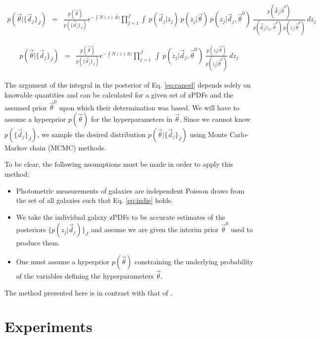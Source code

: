 \documentclass[preprint]{aastex}
\begin{document}
\begin{eqnarray}
\label{eq:expand}
p(\vec{\theta}|\{\vec{d}_{j}\}_{J}) &=& \frac{p(\vec{\theta})}{p(\{\vec{d}_{j}\}_{J})}e^{-\int N(z)\ dz}\prod_{j=1}^{J}\int\ p(\vec{d}_{j}|z_{j})\ p(z_{j}|\vec{\theta})\ p(z_{j}|\vec{d}_{j},\vec{\theta}^{0})\ \frac{p(\vec{d}_{j}|\vec{\theta}^{0})}{p(\vec{d}_{j}|z_{j},\vec{\theta}^{0})\ p(z_{j}|\vec{\theta}^{0})}\ dz_{j}
\end{eqnarray}

\begin{eqnarray}
\label{eq:cancel}
p(\vec{\theta}|\{\vec{d}_{j}\}_{J}) &=& \frac{p(\vec{\theta})}{p(\{\vec{d}_{j}\}_{J})}e^{-\int N(z)\ dz}\prod_{j=1}^{J}\ \int\ p(z_{j}|\vec{d}_{j},\vec{\theta}^{0})\ \frac{p(z_{j}|\vec{\theta})}{p(z_{j}|\vec{\theta}^{0})}\ dz_{j}
\end{eqnarray}

The argument of the integral in the posterior of Eq. \ref{eq:cancel} depends solely on knowable quantities and can be calculated for a given set of zPDFs and the assumed prior $\vec{\theta}^{0}$ upon which their determination was based.  We will have to assume a hyperprior $p(\vec{\theta})$ for the hyperparameters in $\vec{\theta}$.  Since we cannot know $p(\{\vec{d}_{j}\}_{J})$, we sample the desired distribution $p(\vec{\theta}|\{\vec{d}_{j}\}_{J})$ using Monte Carlo-Markov chain (MCMC) methods.  

To be clear, the following assumptions must be made in order to apply this method:

\begin{itemize}
\item Photometric measurements of galaxies are independent Poisson draws from the set of all galaxies such that Eq. \ref{eq:indie} holds.
\item We take the individual galaxy zPDFs to be accurate estimates of the posteriors $\{p(z_{j}|\vec{d}_{j})\}_{J}$ and assume we are given the interim prior $\vec{\theta}^{0}$ used to produce them.
\item One must assume a hyperprior $p(\vec{\theta})$ constraining the underlying probability of the variables defining the hyperparameters $\vec{\theta}$.
\end{itemize}

The method presented here is in contrast with that of \citet{she11}.  

\section{Experiments}
\label{sec:exp}
\end{document}
